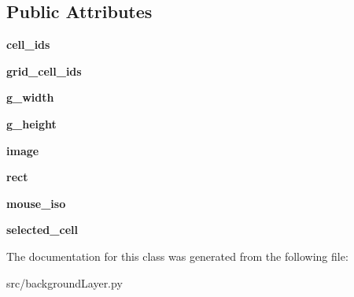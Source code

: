 \subsection*{\-Public \-Attributes}
\begin{DoxyCompactItemize}
\item 
\hypertarget{classsrc_1_1background_layer_1_1_background_layer_afd6f2b7f9f6495417d94970d1d2ec967}{{\bfseries cell\-\_\-ids}}\label{classsrc_1_1background_layer_1_1_background_layer_afd6f2b7f9f6495417d94970d1d2ec967}

\item 
\hypertarget{classsrc_1_1background_layer_1_1_background_layer_a43dee3c333f7296c2ea026d55b6ac169}{{\bfseries grid\-\_\-cell\-\_\-ids}}\label{classsrc_1_1background_layer_1_1_background_layer_a43dee3c333f7296c2ea026d55b6ac169}

\item 
\hypertarget{classsrc_1_1background_layer_1_1_background_layer_a2a02b80a1f4f39b48dfea30b6df943f1}{{\bfseries g\-\_\-width}}\label{classsrc_1_1background_layer_1_1_background_layer_a2a02b80a1f4f39b48dfea30b6df943f1}

\item 
\hypertarget{classsrc_1_1background_layer_1_1_background_layer_aa6f5b9677ae177add2a0ceef52c7a173}{{\bfseries g\-\_\-height}}\label{classsrc_1_1background_layer_1_1_background_layer_aa6f5b9677ae177add2a0ceef52c7a173}

\item 
\hypertarget{classsrc_1_1background_layer_1_1_background_layer_ac4dba44bbe581b0faf8d4f96dd6c2bc0}{{\bfseries image}}\label{classsrc_1_1background_layer_1_1_background_layer_ac4dba44bbe581b0faf8d4f96dd6c2bc0}

\item 
\hypertarget{classsrc_1_1background_layer_1_1_background_layer_a237d1f114e3f4cf182d7a2531e5f98d7}{{\bfseries rect}}\label{classsrc_1_1background_layer_1_1_background_layer_a237d1f114e3f4cf182d7a2531e5f98d7}

\item 
\hypertarget{classsrc_1_1background_layer_1_1_background_layer_afe0ff5016da183013ef0ca0459f04d97}{{\bfseries mouse\-\_\-iso}}\label{classsrc_1_1background_layer_1_1_background_layer_afe0ff5016da183013ef0ca0459f04d97}

\item 
\hypertarget{classsrc_1_1background_layer_1_1_background_layer_af7bc70e9f84e8e971f3fcfb8f0e08c0e}{{\bfseries selected\-\_\-cell}}\label{classsrc_1_1background_layer_1_1_background_layer_af7bc70e9f84e8e971f3fcfb8f0e08c0e}

\end{DoxyCompactItemize}


\-The documentation for this class was generated from the following file\-:\begin{DoxyCompactItemize}
\item 
src/background\-Layer.\-py\end{DoxyCompactItemize}
